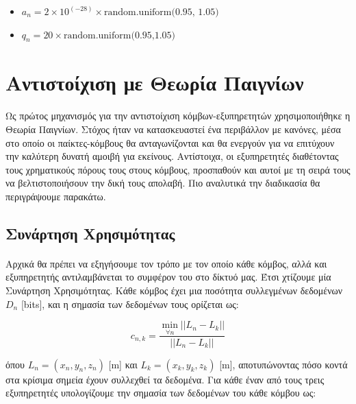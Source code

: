\begin{itemize}
    \item $a_n = 2 \times 10^{(-28)} \times \text{random.uniform(0.95, 1.05)}$
    \item $q_n = 20 \times \text{random.uniform(0.95,1.05)}$
\end{itemize}

\section{Αντιστοίχιση με Θεωρία Παιγνίων}

\vspace{-0.2cm}

\paragraph{}Ως πρώτος μηχανισμός για την αντιστοίχιση κόμβων-εξυπηρετητών χρησιμοποιήθηκε η Θεωρία Παιγνίων. Στόχος ήταν να κατασκευαστεί ένα περιβάλλον με κανόνες, μέσα στο οποίο οι παίκτες-κόμβους θα ανταγωνίζονται και θα ενεργούν για να επιτύχουν την καλύτερη δυνατή αμοιβή για εκείνους. Αντίστοιχα, οι εξυπηρετητές διαθέτοντας τους χρηματικούς πόρους τους στους κόμβους, προσπαθούν και αυτοί με τη σειρά τους να βελτιστοποιήσουν την δική τους απολαβή. Πιο αναλυτικά την διαδικασία θα περιγράψουμε παρακάτω.

\subsection{Συνάρτηση Χρησιμότητας}

\paragraph{}Αρχικά θα πρέπει να εξηγήσουμε τον τρόπο με τον οποίο κάθε κόμβος, αλλά και εξυπηρετητής αντιλαμβάνεται το συμφέρον του στο δίκτυό μας. Έτσι χτίζουμε μία Συνάρτηση Χρησιμότητας. Κάθε κόμβος έχει μια ποσότητα συλλεγμένων δεδομένων $D_n$ [bits], και η σημασία των δεδομένων τους ορίζεται ως:

\vspace{-5pt}

\begin{equation}
c_{n,k}=\frac{\min\limits_{\forall n} ||L_n-L_k||}{||L_n-L_k||}
\label{eq1}
\end{equation}

\noindent
όπου $L_n = (x_n,y_n,z_n)$ [m] και $L_k = (x_k,y_k,z_k)$ [m], αποτυπώνοντας πόσο κοντά στα κρίσιμα σημεία έχουν συλλεχθεί τα δεδομένα. Για κάθε έναν από τους τρεις εξυπηρετητές υπολογίζουμε την σημασία των δεδομένων του κάθε κόμβου ως:

